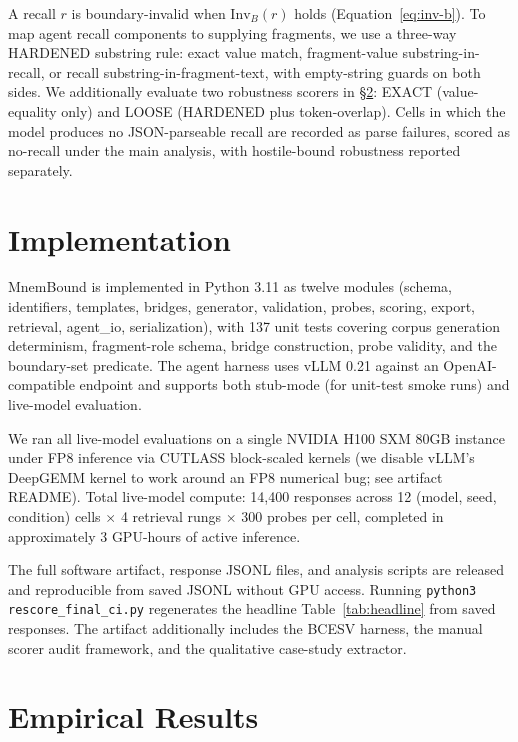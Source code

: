 \documentclass[conference,compsoc]{IEEEtran}
\begin{document}
A recall $r$ is boundary-invalid when $\mathrm{Inv}_{B}(r)$ holds (Equation~\ref{eq:inv-b}). To map agent recall components to supplying fragments, we use a three-way HARDENED substring rule: exact value match, fragment-value substring-in-recall, or recall substring-in-fragment-text, with empty-string guards on both sides. We additionally evaluate two robustness scorers in \S\ref{sec:results}: EXACT (value-equality only) and LOOSE (HARDENED plus token-overlap). Cells in which the model produces no JSON-parseable recall are recorded as parse failures, scored as no-recall under the main analysis, with hostile-bound robustness reported separately.

\section{Implementation}\label{sec:implementation}

MnemBound is implemented in Python 3.11 as twelve modules (schema, identifiers, templates, bridges, generator, validation, probes, scoring, export, retrieval, agent\_io, serialization), with 137 unit tests covering corpus generation determinism, fragment-role schema, bridge construction, probe validity, and the boundary-set predicate. The agent harness uses vLLM 0.21 against an OpenAI-compatible endpoint and supports both stub-mode (for unit-test smoke runs) and live-model evaluation.

We ran all live-model evaluations on a single NVIDIA H100 SXM 80GB instance under FP8 inference via CUTLASS block-scaled kernels (we disable vLLM's DeepGEMM kernel to work around an FP8 numerical bug; see artifact README). Total live-model compute: 14{,}400 responses across 12 (model, seed, condition) cells $\times$ 4 retrieval rungs $\times$ 300 probes per cell, completed in approximately 3 GPU-hours of active inference.

The full software artifact, response JSONL files, and analysis scripts are released and reproducible from saved JSONL without GPU access. Running \texttt{python3 rescore\_final\_ci.py} regenerates the headline Table~\ref{tab:headline} from saved responses. The artifact additionally includes the BCESV harness, the manual scorer audit framework, and the qualitative case-study extractor.

\section{Empirical Results}\label{sec:results}
\end{document}
